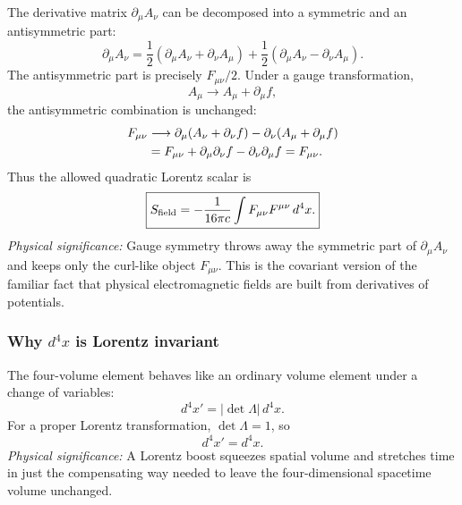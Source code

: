 The derivative matrix $\partial_\mu A_\nu$ can be decomposed into a symmetric
and an antisymmetric part:
\begin{equation}\label{eq:lec09-sym-antisym}
  \partial_\mu A_\nu
  =
  \frac{1}{2}\left(\partial_\mu A_\nu+\partial_\nu A_\mu\right)
  +
  \frac{1}{2}\left(\partial_\mu A_\nu-\partial_\nu A_\mu\right).
\end{equation}
The antisymmetric part is precisely $F_{\mu\nu}/2$.  Under a gauge
transformation,
\begin{equation}\label{eq:lec09-gauge}
  A_\mu \longrightarrow A_\mu+\partial_\mu f ,
\end{equation}
the antisymmetric combination is unchanged:
\begin{align}
  F_{\mu\nu}
  &\longrightarrow
  \partial_\mu(A_\nu+\partial_\nu f)
  -\partial_\nu(A_\mu+\partial_\mu f) \notag\\
  &= F_{\mu\nu}
  +\partial_\mu\partial_\nu f
  -\partial_\nu\partial_\mu f
  = F_{\mu\nu}.
  \label{eq:lec09-F-gauge-inv}
\end{align}
Thus the allowed quadratic Lorentz scalar is
\begin{equation}\label{eq:lec09-free-action}
  \boxed{
  S_{\rm field}
  =
  -\frac{1}{16\pi c}\int F_{\mu\nu}F^{\mu\nu}\,d^4x .
  }
\end{equation}
\textit{Physical significance:} Gauge symmetry throws away the symmetric part
of $\partial_\mu A_\nu$ and keeps only the curl-like object $F_{\mu\nu}$.  This
is the covariant version of the familiar fact that physical electromagnetic
fields are built from derivatives of potentials.

\subsubsection*{Why $d^4x$ is Lorentz invariant}

The four-volume element behaves like an ordinary volume element under a change
of variables:
\begin{equation}\label{eq:lec09-jacobian}
  d^4x' = \left|\det \Lambda\right|\,d^4x .
\end{equation}
For a proper Lorentz transformation, $\det\Lambda=1$, so
\begin{equation}\label{eq:lec09-d4x-scalar}
  \boxed{d^4x'=d^4x.}
\end{equation}
\textit{Physical significance:} A Lorentz boost squeezes spatial volume and
stretches time in just the compensating way needed to leave the four-dimensional
spacetime volume unchanged.


